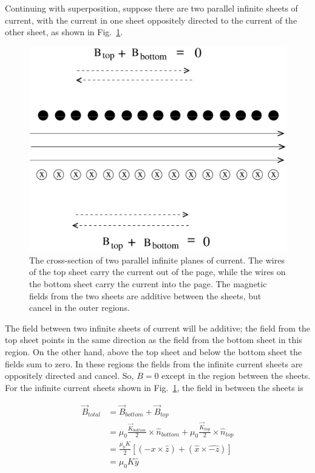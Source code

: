 \documentclass[12pt]{article}
\begin{document}
\begin{flushleft}
Continuing with superposition, suppose there are two parallel infinite sheets of current, with the current in one sheet oppositely directed to the current of the other sheet, as shown in Fig.~\ref{fig:2sheet}.
\vspace{.2in}

\begin{figure}[h]
\centering
\includegraphics*[trim=0cm 0cm 0cm 0cm, clip=true, width=0.5\columnwidth]{twosheets.pdf}
\caption{\small The cross-section of two parallel infinite planes of current.  The wires of the top sheet carry the current out of the page, while the wires on the bottom sheet carry the current into the page.  The magnetic fields from the two sheets are additive between the sheets, but cancel in the outer regions.}
\label{fig:2sheet}
\end{figure}

The field between two infinite sheets of current will be additive; the field from the top sheet points in the same direction as the field from the bottom sheet in this region.  On the other hand, above the top sheet and below the bottom sheet the fields sum to zero.  In these regions the fields from the infinite current sheets are oppositely directed and cancel.  So, $B=0$ except in the region between the sheets.  For the infinite current sheets shown in Fig.~\ref{fig:2sheet}, the field in between the sheets is

\begin{equation*}
\begin{aligned}
 \vec{B}_{total} & = \vec{B}_{bottom} + \vec{B}_{top} \\
 & =\mu_{0} \frac{\vec{K}_{bottom}}{2} \times \hat{n}_{bottom} + \mu_{0}\frac{\vec{K}_{top}}{2} \times \hat{n}_{top} \\
&  =\frac{\mu_{0}K}{2} \left[ (\hat{-x} \times \hat{z}) + (\hat{x} \times \hat{-z}) \right] \\
& =\mu_{0}K  \hat{y} 
\end{aligned}
\end{equation*}


\end{flushleft}
\end{document}
